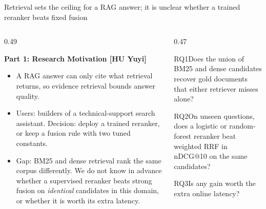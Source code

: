 \documentclass[aspectratio=169,10pt,xcolor=table]{beamer}
\newcommand{\spk}{}
\newcommand{\speakername}{HU Yuyi}
\newcommand{\sect}[1]{{\small\bfseries\color{ink}#1\par}\vspace{2pt}}
\begin{document}
\renewcommand{\speakername}{HU Yuyi (60159701)}
\renewcommand{\spk}{0:45}
\begin{frame}{Retrieval sets the ceiling for a RAG answer; it is unclear whether a trained reranker beats fixed fusion}
\begin{columns}[T,onlytextwidth]
\begin{column}{0.49\textwidth}
\sect{Part 1: Research Motivation [HU Yuyi]}
\begin{itemize}
\item A RAG answer can only cite what retrieval returns, so evidence retrieval bounds answer quality.
\item Users: builders of a technical-support search assistant. Decision: deploy a trained reranker,
  or keep a fusion rule with two tuned constants.
\item Gap: BM25 and dense retrieval rank the same corpus differently. We do not know in advance whether a
  supervised reranker beats strong fusion on \emph{identical} candidates in this domain, or whether it
  is worth its extra latency.
\end{itemize}
\end{column}
\begin{column}{0.47\textwidth}
\begin{rqcard}{RQ1}Does the union of BM25 and dense candidates recover gold documents that either retriever misses alone?\end{rqcard}
\begin{rqcard}{RQ2}On unseen questions, does a logistic or random-forest reranker beat weighted RRF in nDCG@10 on the same candidates?\end{rqcard}
\begin{rqcard}{RQ3}Is any gain worth the extra online latency?\end{rqcard}
\end{column}
\end{columns}
\end{frame}
\end{document}
